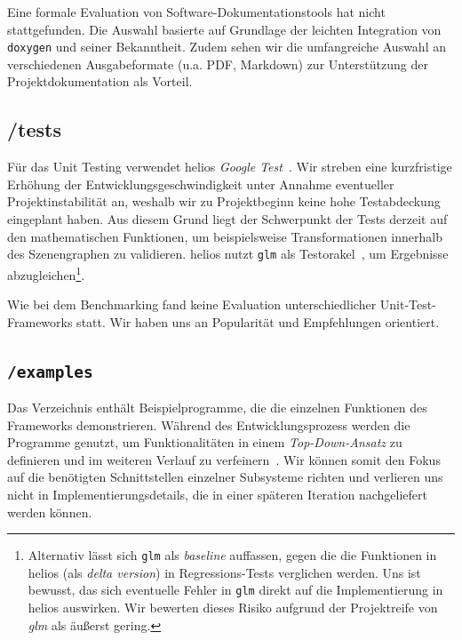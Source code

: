 Eine formale Evaluation von Software-Dokumentationstools hat nicht stattgefunden.
Die Auswahl basierte auf Grundlage der leichten Integration von \texttt{doxygen} und seiner Bekanntheit.
Zudem sehen wir die umfangreiche Auswahl an verschiedenen Ausgabeformate (u.a. PDF, Markdown) zur Unterstützung der Projektdokumentation als Vorteil.


\subsection*{/tests}
Für das Unit Testing verwendet helios \textit{Google Test}~\cite[]{googletestgithub}.
Wir streben eine kurzfristige Erhöhung der Entwicklungsgeschwindigkeit unter Annahme eventueller Projektinstabilität an, weshalb wir zu Projektbeginn keine hohe Testabdeckung eingeplant haben.
Aus diesem Grund liegt der Schwerpunkt der Tests derzeit auf den mathematischen Funktionen, um beispielsweise Transformationen innerhalb des Szenengraphen zu validieren. helios nutzt \texttt{glm} als Testorakel~\cite[917 ff.]{Bin99}, um Ergebnisse abzugleichen\footnote{
    Alternativ lässt sich \texttt{glm} als \textit{baseline} auffassen, gegen die die Funktionen in helios (als \textit{delta version}) in Regressions-Tests verglichen werden. Uns ist bewusst, das sich eventuelle Fehler in \texttt{glm} direkt auf die Implementierung in helios auswirken. Wir bewerten dieses Risiko aufgrund der Projektreife von \textit{glm} als äußerst gering.
}.

Wie bei dem Benchmarking fand keine Evaluation unterschiedlicher Unit-Test-Frameworks statt.
Wir haben uns an Popularität und Empfehlungen orientiert.

\subsection*{\texttt{/examples}}
Das Verzeichnis enthält Beispielprogramme, die die einzelnen Funktionen des Frameworks demonstrieren.
Während des Entwicklungsprozess werden die Programme genutzt, um Funktionalitäten in einem \textit{Top-Down-Ansatz} zu definieren und im weiteren Verlauf zu verfeinern~\cite[]{Wir71}.
Wir können somit den Fokus auf die benötigten Schnittstellen einzelner Subsysteme richten und verlieren uns nicht in Implementierungsdetails, die in einer späteren Iteration nachgeliefert werden können.

